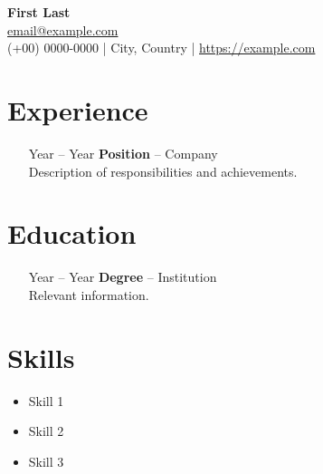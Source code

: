 \documentclass[11pt,a4paper]{article}
\begin{document}
\begin{center}
    {\LARGE \textbf{First Last}}\\[1ex]
    \href{mailto:email@example.com}{email@example.com}\\
    (+00) 0000-0000 | City, Country | \href{https://example.com}{https://example.com} \\
\end{center}

\section*{Experience}
\begin{itemize}
    \item[Year -- Year] \textbf{Position} -- Company\\
    Description of responsibilities and achievements.
\end{itemize}

\section*{Education}
\begin{itemize}
    \item[Year -- Year] \textbf{Degree} -- Institution\\
    Relevant information.
\end{itemize}

\section*{Skills}
\begin{itemize}
    \item Skill 1
    \item Skill 2
    \item Skill 3
\end{itemize}
\end{document}
